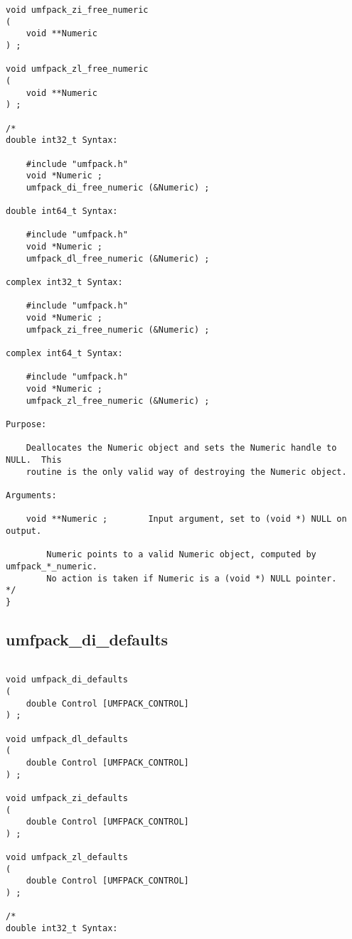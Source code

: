 \documentclass[11pt]{article}
\begin{document}
{{\begin{verbatim}
void umfpack_zi_free_numeric
(
    void **Numeric
) ;

void umfpack_zl_free_numeric
(
    void **Numeric
) ;

/*
double int32_t Syntax:

    #include "umfpack.h"
    void *Numeric ;
    umfpack_di_free_numeric (&Numeric) ;

double int64_t Syntax:

    #include "umfpack.h"
    void *Numeric ;
    umfpack_dl_free_numeric (&Numeric) ;

complex int32_t Syntax:

    #include "umfpack.h"
    void *Numeric ;
    umfpack_zi_free_numeric (&Numeric) ;

complex int64_t Syntax:

    #include "umfpack.h"
    void *Numeric ;
    umfpack_zl_free_numeric (&Numeric) ;

Purpose:

    Deallocates the Numeric object and sets the Numeric handle to NULL.  This
    routine is the only valid way of destroying the Numeric object.

Arguments:

    void **Numeric ;        Input argument, set to (void *) NULL on output.

        Numeric points to a valid Numeric object, computed by umfpack_*_numeric.
        No action is taken if Numeric is a (void *) NULL pointer.
*/
}

\end{verbatim}


\subsection{umfpack\_di\_defaults}

{\footnotesize
\begin{verbatim}

void umfpack_di_defaults
(
    double Control [UMFPACK_CONTROL]
) ;

void umfpack_dl_defaults
(
    double Control [UMFPACK_CONTROL]
) ;

void umfpack_zi_defaults
(
    double Control [UMFPACK_CONTROL]
) ;

void umfpack_zl_defaults
(
    double Control [UMFPACK_CONTROL]
) ;

/*
double int32_t Syntax:


\end{verbatim}}}}
\end{document}

